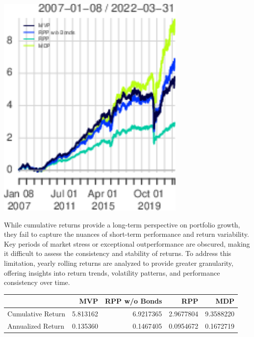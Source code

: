 \documentclass[11pt,preprint]{elsarticle}
\let\origfigure\figure
\let\endorigfigure\endfigure
\renewenvironment{figure}[1][2] {
    \expandafter\origfigure\expandafter[H]
} {
    \endorigfigure
}
\let\origtable\table
\let\endorigtable\endtable
\renewenvironment{table}[1][2] {
    \expandafter\origtable\expandafter[H]
} {
    \endorigtable
}
\numberwithin{equation}{section}
\numberwithin{figure}{section}
\numberwithin{table}{section}
\begin{document}
\begin{figure}[H]

{\centering \includegraphics{Essay_files/figure-latex/Figure1-1} 

}

\caption{Cumulative returns over the whole portfolio runtime \label{Figure1}}\label{fig:Figure1}
\end{figure}

While cumulative returns provide a long-term perspective on portfolio
growth, they fail to capture the nuances of short-term performance and
return variability. Key periods of market stress or exceptional
outperformance are obscured, making it difficult to assess the
consistency and stability of returns. To address this limitation, yearly
rolling returns are analyzed to provide greater granularity, offering
insights into return trends, volatility patterns, and performance
consistency over time.

\begin{table}
\centering
\caption{\label{tab:returns}Cumulative and Annualized Returns}
\centering
\begin{tabular}[t]{l|r|r|r|r}
\hline
  & MVP & RPP w/o Bonds & RPP & MDP\\
\hline
Cumulative Return & 5.813162 & 6.9217365 & 2.9677804 & 9.3588220\\
\hline
Annualized Return & 0.135360 & 0.1467405 & 0.0954672 & 0.1672719\\
\hline
\end{tabular}
\end{table}
\end{document}

